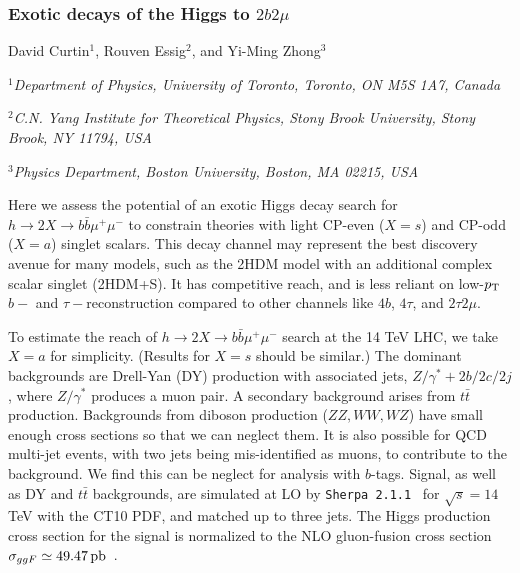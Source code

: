 \subsubsection{Exotic  decays of the Higgs to $2b2\mu$}
\begin{center}
 {David Curtin$^{1}$, Rouven Essig$^{2}$, and Yi-Ming Zhong$^{3}$\\
}
\centerline{{\it $^{1}$Department of Physics, University of Toronto, Toronto, ON M5S 1A7, Canada}}
\centerline{{\it  $^{2}$C.N. Yang Institute for Theoretical Physics, Stony Brook University, Stony Brook, NY 11794, USA}}
\centerline{{\it  $^{3}$Physics Department, Boston University, Boston, MA 02215, USA}}
\end{center}
Here we assess the potential of an exotic Higgs decay search for $h \to 2X \to b\bar{b}\mu^+ \mu^-$ to constrain theories with light CP-even ($X = s$) and CP-odd ($X = a$) singlet scalars.  This decay channel may represent the best discovery avenue for many models, such as the 2HDM model with an additional complex scalar singlet (2HDM+S). It has competitive reach, and is less reliant on low-$p_{\rm T}$ $b-$ and $\tau-$reconstruction compared to other channels like $4b$, $4\tau$, and $2\tau2\mu$. 


To estimate the reach of $h \to 2X \to b\bar{b}\mu^+ \mu^-$ search at the 14 TeV LHC, we take $X =a$ for simplicity. (Results for $X=s$ should be similar.) The dominant backgrounds are Drell-Yan (DY) production with associated jets, \ie $Z/\gamma^*+2b/2c/2j$, where $Z/\gamma^*$ produces a muon pair. A secondary background arises from $t\bar t$ production. Backgrounds from diboson production ($ZZ, WW, WZ$) have small enough cross sections so that we can neglect them. It is also possible for QCD multi-jet events, with two jets being mis-identified as muons, to contribute to the background. We find this can be neglect for analysis with $b$-tags. Signal, as well as DY and $t\bar t$ backgrounds, are simulated at LO by \texttt{Sherpa 2.1.1}~\cite{Gleisberg:2008ta} for $\sqrt{s}=14$ TeV with the CT10 PDF, and matched up to three jets. The Higgs production cross section for the signal is normalized to the NLO gluon-fusion cross section $\sigma_{ggF} \simeq 49.47 \,\text{pb}$~\cite{Dittmaier:2011ti}.  



